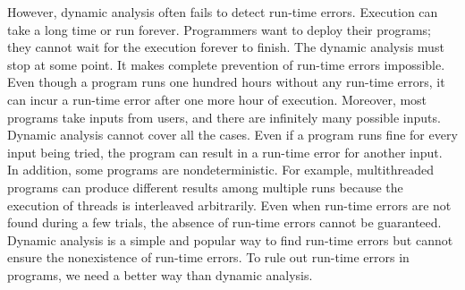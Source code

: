 However, dynamic analysis often fails to detect run-time errors. Execution can take
a long time or run forever. Programmers want to deploy their programs; they
cannot wait for the execution forever to finish. The dynamic analysis must stop at some point.
It makes complete prevention of run-time errors impossible. Even though a
program runs one hundred hours without any run-time errors, it can incur
a run-time error after one more hour of execution. Moreover, most
programs take inputs from users, and there are infinitely many possible inputs.
Dynamic analysis cannot cover all the cases. Even if a program runs fine for every input
being tried, the program can result in a run-time error for another input.
In addition, some programs are nondeterministic. For example, multithreaded
programs can produce different results among multiple runs because the execution of
threads is interleaved arbitrarily. Even when run-time errors are not found
during a few trials, the absence of run-time errors cannot be guaranteed.
Dynamic analysis is a simple and popular way to find run-time errors but cannot ensure
the nonexistence of run-time errors. To rule out run-time errors in programs, we
need a better way than dynamic analysis.


